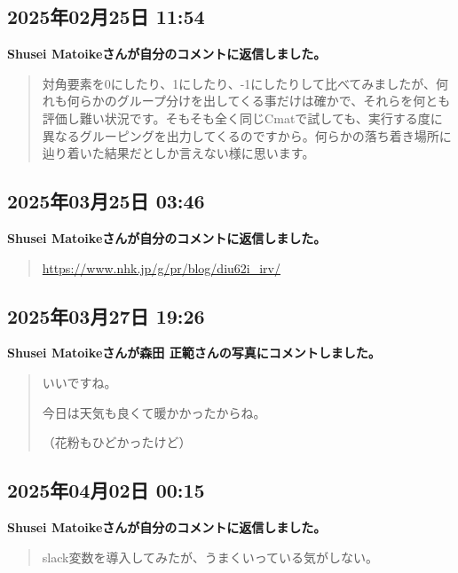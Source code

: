 \subsection*{2025年02月25日 11:54}

\textbf{Shusei Matoikeさんが自分のコメントに返信しました。}

\begin{quote}
対角要素を0にしたり、1にしたり、-1にしたりして比べてみましたが、何れも何らかのグループ分けを出してくる事だけは確かで、それらを何とも評価し難い状況です。そもそも全く同じCmatで試しても、実行する度に異なるグルーピングを出力してくるのですから。何らかの落ち着き場所に辿り着いた結果だとしか言えない様に思います。
\end{quote}

\subsection*{2025年03月25日 03:46}

\textbf{Shusei Matoikeさんが自分のコメントに返信しました。}

\begin{quote}
\url{https://www.nhk.jp/g/pr/blog/diu62i_irv/}
\end{quote}

\subsection*{2025年03月27日 19:26}

\textbf{Shusei Matoikeさんが森田 正範さんの写真にコメントしました。}

\begin{quote}
いいですね。

今日は天気も良くて暖かかったからね。

（花粉もひどかったけど）
\end{quote}

\subsection*{2025年04月02日 00:15}

\textbf{Shusei Matoikeさんが自分のコメントに返信しました。}

\begin{quote}
slack変数を導入してみたが、うまくいっている気がしない。
\end{quote}

